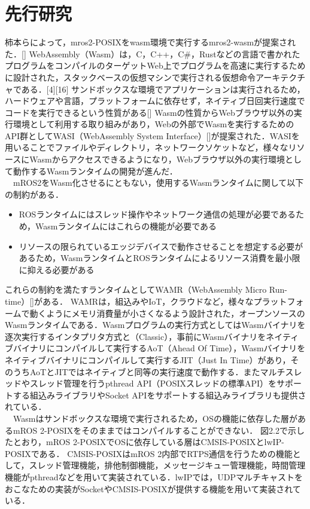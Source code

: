 \chapter{先行研究}
柿本らによって，mros2-POSIXをwasm環境で実行するmros2-wasmが提案された．[]
WebAssembly（Wasm）は，C，C++，C#，Rustなどの言語で書かれたプログラムをコンパイルのターゲットWeb上でプログラムを高速に実行するために設計された，スタックベースの仮想マシンで実行される仮想命令アーキテクチャである．[4][16]
サンドボックスな環境でアプリケーションは実行されるため，ハードウェアや言語，プラットフォームに依存せず，ネイティブ日回実行速度でコードを実行できるという性質がある[]
Wasmの性質からWebブラウザ以外の実行環境として利用する取り組みがあり，Webの外部でWasmを実行するためのAPI群としてWASI（WebAssembly System Interface）[]が提案された．WASIを用いることでファイルやディレクトリ，ネットワークソケットなど，様々なリソースにWasmからアクセスできるようになり，Webブラウザ以外の実行環境として動作するWasmランタイムの開発が進んだ．
\\　mROS2をWasm化させるにともない，使用するWasmランタイムに関して以下の制約がある．
\begin{itemize}
    \item ROSランタイムにはスレッド操作やネットワーク通信の処理が必要であるため，Wasmランタイムにはこれらの機能が必要である
    \item リソースの限られているエッジデバイスで動作させることを想定する必要があるため，WasmランタイムとROSランタイムによるリソース消費を最小限に抑える必要がある
\end{itemize}
これらの制約を満たすランタイムとしてWAMR（WebAssembly Micro Run-time）[]がある．
WAMRは，組込みやIoT，クラウドなど，様々なプラットフォームで動くようにメモリ消費量が小さくなるよう設計された，オープンソースのWasmランタイムである．Wasmプログラムの実行方式としてはWasmバイナリを逐次実行するインタプリタ方式と（Classic），事前にWasmバイナリをネイティブバイナリにコンパイルして実行するAoT（Ahead Of Time），Wasmバイナリをネイティブバイナリにコンパイルして実行するJIT（Just In Time）があり，そのうちAoTとJITではネイティブと同等の実行速度で動作する．またマルチスレッドやスレッド管理を行うpthread API（POSIXスレッドの標準API）をサポートする組込みライブラリやSocket APIをサポートする組込みライブラリも提供されている．\\
　Wasmはサンドボックスな環境で実行されるため，OSの機能に依存した層があるmROS 2-POSIXをそのままではコンパイルすることができない．
図2.2で示したとおり，mROS 2-POSIXでOSに依存している層はCMSIS-POSIXとlwIP-POSIXである．
CMSIS-POSIXはmROS 2内部でRTPS通信を行うための機能として，スレッド管理機能，排他制御機能，メッセージキュー管理機能，時間管理機能がpthreadなどを用いて実装されている．lwIPでは，UDPマルチキャストをおこなための実装がSocketやCMSIS-POSIXが提供する機能を用いて実装されている．
